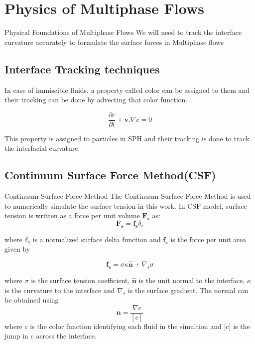 \documentclass{beamer}
\begin{document}
\section{Physics of Multiphase Flows}
\begin{frame}{Physical Foundations of Multiphase Flows}
We will need to track the interface curvature accurately to formulate the surface forces in Multiphase flows
\subsection{Interface Tracking techniques}
In case of immiscible fluids, a property called color can be assigned to them and their tracking can be done by advecting that color function.

\begin{equation*}
\frac{\partial c}{\partial t} + \mathbf{v}.\nabla c = 0 
\end{equation*}

This property is assigned to particles in SPH and their tracking is done to track the interfacial curvature.
\end{frame}

\subsection{Continuum Surface Force Method(CSF)}
\begin{frame}{Continuum Surface Force Method}
\justifying
The Continuum Surface Force Method is used to numerically simulate the surface tension in this work. In CSF model, surface tension is written as a force per unit volume $\mathbf{F_s}$
as:
\begin{equation*}
 \mathbf{F_s} = \mathbf{f_s} \delta_s
\end{equation*}

\noindent
where $\delta_s$ is a normalized surface delta function and $\mathbf{f_s}$ is the force per unit area given by

\begin{equation*}
 \mathbf{f_s} = \sigma \kappa \mathbf{\hat{n}} + \nabla_s \sigma
 \label{forceperarea}
\end{equation*}

\noindent
where $\sigma$ is the surface tension coefficient, $\mathbf{\hat{n}}$ is the unit normal to the interface, $\kappa$ is the curvature to the interface 
and $\nabla_s$ is the surface gradient. The normal can be obtained using
\begin{equation*}
 \mathbf{n} = \frac{\nabla c}{[c]}
\end{equation*}
\noindent
where c is the color function identifying each fluid in the simultion and [c] is the jump in c across the interface. 
\end{frame}
\end{document}
